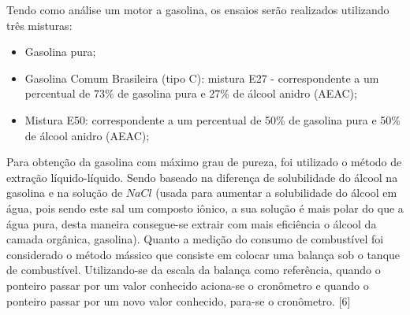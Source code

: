 Tendo como análise um motor a gasolina, os ensaios serão realizados utilizando três misturas:

\begin{itemize}
\item Gasolina pura;
\item Gasolina Comum Brasileira (tipo C): mistura E27 - correspondente a um percentual de 73\% de gasolina pura e 27\% de álcool anidro (AEAC);
\item Mistura E50: correspondente a um percentual de 50\% de gasolina pura e 50\% de álcool anidro (AEAC);
\end{itemize}

Para obtenção da gasolina com máximo grau de pureza, foi utilizado o método de extração líquido-líquido. Sendo baseado na diferença de solubilidade do álcool na gasolina e na solução de $NaCl$ (usada para aumentar a solubilidade do álcool em água, pois sendo este sal um composto iônico, a sua solução é mais polar do que a água pura, desta maneira consegue-se extrair com mais eficiência o álcool da camada orgânica, gasolina).
Quanto a medição do consumo de combustível foi considerado o método mássico que consiste em colocar uma balança sob o tanque de combustível. Utilizando-se da escala da balança como referência, quando o ponteiro passar por um valor conhecido aciona-se o cronômetro e quando o ponteiro passar por um novo valor conhecido, para-se o cronômetro. [6]
